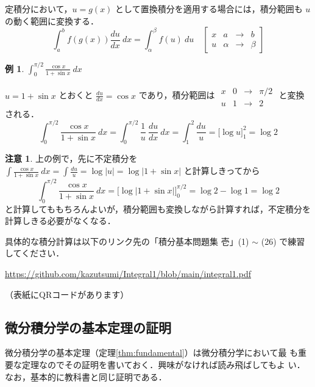 \documentclass[10pt, uplatex, dvipdfmx]{jsarticle}
\theoremstyle{definition}
\newtheorem{example}[theorem]{例}
\newtheorem*{remark}{注意}
\numberwithin{equation}{section}
\newcommand{\ds}{\displaystyle}
\begin{document}
定積分において，$u=g(x)$ として置換積分を適用する場合には，積分範囲も $u$ の動く範囲に変換する．
\[
  \int_{a}^{b} f\left( g(x) \right) \frac{du}{dx} \ dx = \int_{\alpha}^{\beta} f(u) \ du \quad \left[
    \begin{array}{c|ccc}
      x & a & \to & b \\ \hline
      u & \alpha & \to & \beta
    \end{array}
    \right]
\]

\begin{example}
  $\ds \int_{0}^{\pi/2} \frac{\cos x}{1+\sin x} \ dx$
  
  $u=1+\sin x$ とおくと $\ds \frac{du}{dx} = \cos x$ であり，積分範囲は $
  \begin{array}{c|ccc}
    x & 0 & \to & \pi/2 \\ \hline
    u & 1 & \to & 2
  \end{array}$ と変換される．
  \[
    \int_{0}^{\pi/2} \frac{\cos x}{1+\sin x} \ dx = \int_{0}^{\pi/2} \frac{1}{u}~ \frac{du}{dx} \ dx
    = \int_{1}^{2} \frac{du}{u} = \Big[ \log u \Big]_{1}^{2} = \log 2
  \]
\end{example}

\begin{remark}
  上の例で，先に不定積分を
  $\ds \int \frac{\cos x}{1+\sin x} \ dx = \int \frac{du}{u} = \log |u| = \log |1+\sin x|$ と計算しきってから
  \[
    \int_{0}^{\pi/2} \frac{\cos x}{1+\sin x} \ dx = \Big[ \log |1+\sin x| \Big]_{0}^{\pi/2}
    = \log 2 - \log 1 = \log 2
  \]
  と計算してももちろんよいが，積分範囲も変換しながら計算すれば，不定積分を計算しきる必要がなくなる．
\end{remark}


具体的な積分計算は以下のリンク先の「積分基本問題集 壱」(1) $\sim$ (26) で練習してください．
\begin{center}
  \url{https://github.com/kazutsumi/Integral1/blob/main/integral1.pdf}

  （表紙にQRコードがあります）
\end{center}



\subsection{微分積分学の基本定理の証明}

微分積分学の基本定理（定理\ref{thm:fundamental}）は微分積分学において最
も重要な定理なのでその証明を書いておく．興味がなければ読み飛ばしてもよ
い．なお，基本的に教科書と同じ証明である．
\end{document}
